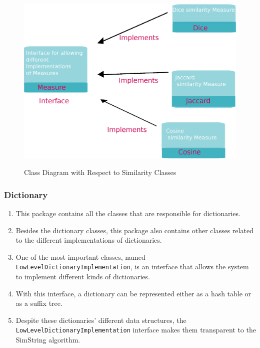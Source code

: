\begin{figure}[h!]
 
  \centering
    \includegraphics[scale=0.45]{graphics/similarities}
   \label{fig:similarityClasses}  
    \caption{Class Diagram with Respect to Similarity Classes}
\end{figure}

\subsubsection*{Dictionary}
\begin{enumerate}[-]
	\item This package contains all the classes that are responsible for dictionaries.
	\item Besides the dictionary classes, this package also contains other classes related to the different implementations of dictionaries.
	\item One of the most important classes, named \texttt{LowLevelDictionaryImplementation}, is an interface that allows the system to implement different kinds of dictionaries.
	\item With this interface, a dictionary can be represented either as a hash table or as a suffix tree.
	\item Despite these dictionaries' different data structures, the \texttt{LowLevelDictionaryImplementation} interface makes them transparent to the SimString algorithm.
\end{enumerate}

